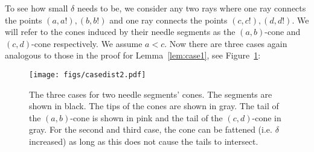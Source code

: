 \documentclass[]{llncs}
\begin{document}
To see how small \(\delta\) needs to be, we consider any two rays where one ray connects the points \((a,a!),(b,b!)\) and  one ray connects the points \((c,c!),(d,d!)\). We will refer to the cones induced by their needle segments as the \((a,b)\)-cone and \((c,d)\)-cone respectively. We assume \(a<c\). Now there are three cases again analogous to those in the proof for Lemma~\ref{lem:case1}, see Figure~\ref{fig:casedistinction2}:
\begin{figure}
      \centering
      \texttt{[image: figs/casedist2.pdf]}
      \caption{The three cases for two needle segments' cones. The segments are shown in black. The tips of the cones are shown in gray. The tail of the $(a,b)$-cone is shown in pink and the tail of the $(c,d)$-cone in gray.%
      For the second and third case, the cone can be fattened (i.e. \(\delta\) increased) as long as this does not cause the tails to intersect.
      }
      \label{fig:casedistinction2}
  \end{figure}
\end{document}

